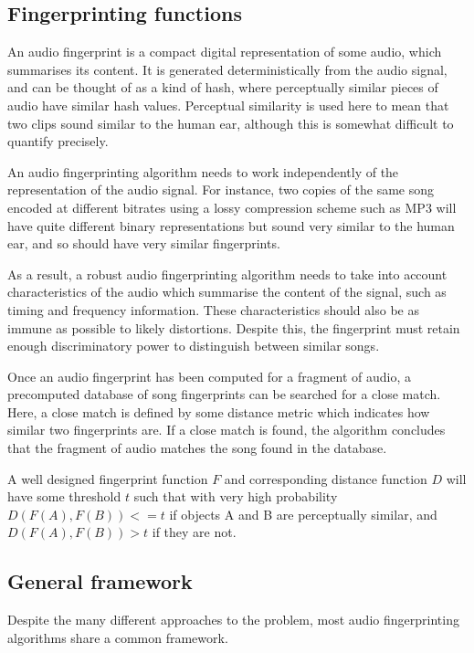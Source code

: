 \documentclass[12pt,a4paper,twoside,openright]{report}
\begin{document}
\subsection{Fingerprinting functions}

An audio fingerprint is a compact digital representation of some audio, which summarises its content. It is generated deterministically from the audio signal, and can be thought of as a kind of hash, where perceptually similar pieces of audio have similar hash values. Perceptual similarity is used here to mean that two clips sound similar to the human ear, although this is somewhat difficult to quantify precisely.

An audio fingerprinting algorithm needs to work independently of the representation of the audio signal. For instance, two copies of the same song encoded at different bitrates using a lossy compression scheme such as MP3  will have quite different binary representations but sound very similar to the human ear, and so should have very similar fingerprints.

As a result, a robust audio fingerprinting algorithm needs to take into account characteristics of the audio which summarise the content of the signal, such as timing and frequency information. These characteristics should also be as immune as possible to likely distortions. Despite this, the fingerprint must retain enough discriminatory power to distinguish between similar songs.

Once an audio fingerprint has been computed for a fragment of audio, a precomputed database of song fingerprints can be searched for a close match. Here, a close match is defined by some distance metric which indicates how similar two fingerprints are. If a close match is found, the algorithm concludes that the fragment of audio matches the song found in the database.

A well designed fingerprint function $F$ and corresponding distance function $D$ will have some threshold $t$ such that with very high probability $D(F(A),F(B)) <= t$ if objects A and B are perceptually similar, and $D(F(A),F(B)) > t$ if they are not.


\subsection{General framework}

Despite the many different approaches to the problem, most audio fingerprinting algorithms share a common framework.
\end{document}
